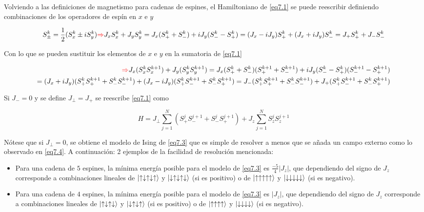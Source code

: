 \documentclass{book}
\begin{document}
Volviendo a las definiciones de magnetismo para cadenas de espines, el Hamiltoniano de \ref{eq7.1} se puede reescribir definiendo combinaciones de los operadores de espín en $x$ e $y$

\begin{equation}\label{eq7.20}S_\pm^k=\frac{1}{2}(S_x^k\pm i S_y^k)\textcolor{red}{\Rightarrow} J_xS_x^k+J_yS_y^k=J_x(S_+^k+S_-^k)+iJ_y(S_-^k-S_+^k)=(J_x-iJ_y)S_+^k+(J_x+iJ_y)S_-^k=J_+S_+^k+J_-S_-^k\end{equation}

Con lo que se pueden sustituir los elementos de $x$ e $y$ en la sumatoria de \ref{eq7.1}

\begin{equation}\begin{aligned}\label{eq7.21}\textcolor{red}{\Rightarrow}J_x(S_x^kS_x^{k+1})+J_y(S_y^kS_y^{k+1})=J_x(S_+^k+S_-^k)(S_+^{k+1}+S_-^{k+1})+iJ_y(S_-^k-S_+^k)(S_-^{k+1}-S_+^{k+1})\\=(J_x+iJ_y)(S_+^kS_+^{k+1}+S_-^kS_-^{k+1})+(J_x-iJ_y)(S_+^kS_-^{k+1}+S_-^kS_+^{k+1})=J_-(S_+^kS_+^{k+1}+S_-^kS_-^{k+1})+J_+(S_+^kS_-^{k+1}+S_-^kS_+^{k+1})\end{aligned}\end{equation}

Si $J_-=0$ y se define $J_\perp=J_+$ se reescribe \ref{eq7.1} como

\begin{equation}\label{eq7.22}H=J_\perp\sum_{j=1}^N (S_+^jS_-^{j+1}+S_-^jS_+^{j+1})+J_z\sum_{j=1}^N S_z^j S_z^{j+1}\end{equation}

Nótese que si $J_\perp=0$, se obtiene el modelo de Ising de \ref{eq7.3} que es simple de resolver a menos que se añada un campo externo como lo observado en \ref{eq7.4}. A continuación: 2 ejemplos de la facilidad de resolución mencionada:
\begin{itemize}
    \item Para una cadena de $5$ espines, la mínima energía posible para el modelo de \ref{eq7.3} es $\frac{-5}{4}\lvert J_z \rvert$, que dependiendo del signo de $J_z$ corresponde a combinaciones lineales de $\ket{\uparrow\downarrow\uparrow\downarrow\uparrow}$ y $\ket{\downarrow\uparrow\downarrow\uparrow\downarrow}$ (si es positivo) o de $\ket{\uparrow\uparrow\uparrow\uparrow\uparrow}$ y $\ket{\downarrow\downarrow\downarrow\downarrow\downarrow}$ (si es negativo).
    \item Para una cadena de $4$ espines, la mínima energía posible para el modelo de \ref{eq7.3} es $\lvert J_z \rvert$, que dependiendo del signo de $J_z$ corresponde a combinaciones lineales de $\ket{\uparrow\downarrow\uparrow\downarrow}$ y $\ket{\downarrow\uparrow\downarrow\uparrow}$ (si es positivo) o de $\ket{\uparrow\uparrow\uparrow\uparrow}$ y $\ket{\downarrow\downarrow\downarrow\downarrow}$ (si es negativo).
\end{itemize}
\end{document}
